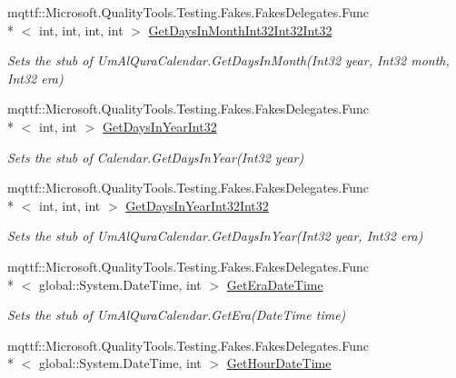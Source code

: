 \begin{DoxyCompactItemize}
mqttf\-::\-Microsoft.\-Quality\-Tools.\-Testing.\-Fakes.\-Fakes\-Delegates.\-Func\\*
$<$ int, int, int, int $>$ \hyperlink{class_system_1_1_globalization_1_1_fakes_1_1_stub_um_al_qura_calendar_a92ffa4443157a5f09c2fb5f3830318d6}{Get\-Days\-In\-Month\-Int32\-Int32\-Int32}
\begin{DoxyCompactList}\small\item\em Sets the stub of Um\-Al\-Qura\-Calendar.\-Get\-Days\-In\-Month(\-Int32 year, Int32 month, Int32 era)\end{DoxyCompactList}\item 
mqttf\-::\-Microsoft.\-Quality\-Tools.\-Testing.\-Fakes.\-Fakes\-Delegates.\-Func\\*
$<$ int, int $>$ \hyperlink{class_system_1_1_globalization_1_1_fakes_1_1_stub_um_al_qura_calendar_a658ece0feea44be3a3b467e2b20e01a5}{Get\-Days\-In\-Year\-Int32}
\begin{DoxyCompactList}\small\item\em Sets the stub of Calendar.\-Get\-Days\-In\-Year(\-Int32 year)\end{DoxyCompactList}\item 
mqttf\-::\-Microsoft.\-Quality\-Tools.\-Testing.\-Fakes.\-Fakes\-Delegates.\-Func\\*
$<$ int, int, int $>$ \hyperlink{class_system_1_1_globalization_1_1_fakes_1_1_stub_um_al_qura_calendar_a9e9053e5d487900362f9607e15637b00}{Get\-Days\-In\-Year\-Int32\-Int32}
\begin{DoxyCompactList}\small\item\em Sets the stub of Um\-Al\-Qura\-Calendar.\-Get\-Days\-In\-Year(\-Int32 year, Int32 era)\end{DoxyCompactList}\item 
mqttf\-::\-Microsoft.\-Quality\-Tools.\-Testing.\-Fakes.\-Fakes\-Delegates.\-Func\\*
$<$ global\-::\-System.\-Date\-Time, int $>$ \hyperlink{class_system_1_1_globalization_1_1_fakes_1_1_stub_um_al_qura_calendar_a568eefa353c0e71f40d6b3fc3ca425b8}{Get\-Era\-Date\-Time}
\begin{DoxyCompactList}\small\item\em Sets the stub of Um\-Al\-Qura\-Calendar.\-Get\-Era(\-Date\-Time time)\end{DoxyCompactList}\item 
mqttf\-::\-Microsoft.\-Quality\-Tools.\-Testing.\-Fakes.\-Fakes\-Delegates.\-Func\\*
$<$ global\-::\-System.\-Date\-Time, int $>$ \hyperlink{class_system_1_1_globalization_1_1_fakes_1_1_stub_um_al_qura_calendar_a1dd8ff1599bd0a91083bc9603ee79863}{Get\-Hour\-Date\-Time}

\end{DoxyCompactItemize}
